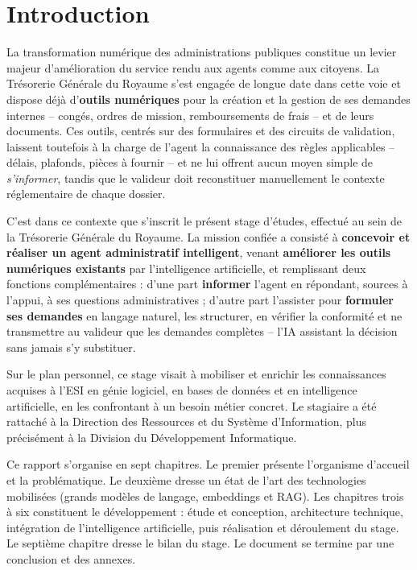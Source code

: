 \documentclass[a4paper,12pt,oneside]{report}
\begin{document}
\chapter*{Introduction}

La transformation numérique des administrations publiques constitue un levier
majeur d'amélioration du service rendu aux agents comme aux citoyens. La
Trésorerie Générale du Royaume s'est engagée de longue date dans cette voie et
dispose déjà d'\textbf{outils numériques} pour la création et la gestion de ses
demandes internes -- congés, ordres de mission, remboursements de frais -- et de
leurs documents. Ces outils, centrés sur des formulaires et des circuits de
validation, laissent toutefois à la charge de l'agent la connaissance des règles
applicables -- délais, plafonds, pièces à fournir -- et ne lui offrent aucun
moyen simple de \emph{s'informer}, tandis que le valideur doit reconstituer
manuellement le contexte réglementaire de chaque dossier.

C'est dans ce contexte que s'inscrit le présent stage d'études, effectué au sein
de la Trésorerie Générale du Royaume. La mission confiée a consisté à
\textbf{concevoir et réaliser un agent administratif intelligent}, venant
\textbf{améliorer les outils numériques existants} par l'intelligence
artificielle, et remplissant deux fonctions complémentaires : d'une part
\textbf{informer} l'agent en
répondant, sources à l'appui, à ses questions administratives ; d'autre part
l'assister pour \textbf{formuler ses demandes} en langage naturel, les
structurer, en vérifier la conformité et ne transmettre au valideur que les
demandes complètes -- l'IA assistant la décision sans jamais s'y substituer.

Sur le plan personnel, ce stage visait à mobiliser et enrichir les connaissances
acquises à l'ESI en génie logiciel, en bases de données et en intelligence
artificielle, en les confrontant à un besoin métier concret. Le stagiaire a été
rattaché à la Direction des Ressources et du Système d'Information, plus
précisément à la Division du Développement Informatique.

Ce rapport s'organise en sept chapitres. Le premier présente l'organisme
d'accueil et la problématique. Le deuxième dresse un état de l'art des
technologies mobilisées (grands modèles de langage, embeddings et RAG). Les
chapitres trois à six constituent le développement : étude et conception,
architecture technique, intégration de l'intelligence artificielle, puis
réalisation et déroulement du stage. Le septième chapitre dresse le bilan du
stage. Le document se termine par une conclusion et des annexes.
\end{document}
